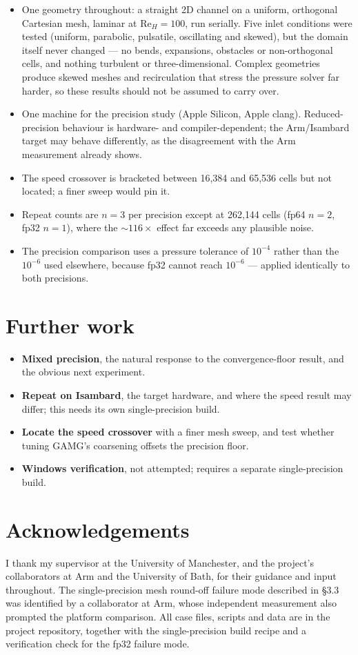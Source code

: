\documentclass[10pt,twocolumn]{article}
\begin{document}
\begin{itemize}
  \item One geometry throughout: a straight 2D channel on a uniform, orthogonal
  Cartesian mesh, laminar at $\mathrm{Re}_H = 100$, run serially. Five inlet
  conditions were tested (uniform, parabolic, pulsatile, oscillating and skewed),
  but the domain itself never changed --- no bends, expansions, obstacles or
  non-orthogonal cells, and nothing turbulent or three-dimensional. Complex
  geometries produce skewed meshes and recirculation that stress the pressure
  solver far harder, so these results should not be assumed to carry over.
  \item One machine for the precision study (Apple Silicon, Apple clang).
  Reduced-precision behaviour is hardware- and compiler-dependent; the
  Arm/Isambard target may behave differently, as the disagreement with the Arm
  measurement already shows.
  \item The speed crossover is bracketed between 16{,}384 and 65{,}536 cells but
  not located; a finer sweep would pin it.
  \item Repeat counts are $n=3$ per precision except at 262{,}144 cells
  (fp64 $n=2$, fp32 $n=1$), where the ${\sim}116\times$ effect far exceeds any
  plausible noise.
  \item The precision comparison uses a pressure tolerance of $10^{-4}$ rather
  than the $10^{-6}$ used elsewhere, because fp32 cannot reach $10^{-6}$ ---
  applied identically to both precisions.
\end{itemize}

\section{Further work}

\begin{itemize}
  \item \textbf{Mixed precision}, the natural response to the
  convergence-floor result, and the obvious next experiment.
  \item \textbf{Repeat on Isambard}, the target hardware, and where the
  speed result may differ; this needs its own single-precision build.
  \item \textbf{Locate the speed crossover} with a finer mesh sweep, and test
  whether tuning GAMG's coarsening offsets the precision floor.
  \item \textbf{Windows verification}, not attempted; requires a separate
  single-precision build.
\end{itemize}

\section*{Acknowledgements}
\small
I thank my supervisor at the University of Manchester, and the project's
collaborators at Arm and the University of Bath, for their guidance and input
throughout. The single-precision mesh round-off failure mode described in
\S3.3 was identified by a collaborator at Arm, whose independent measurement also
prompted the platform comparison. All case files, scripts and data are in the
project repository, together with the single-precision build recipe and a
verification check for the fp32 failure mode.
\end{document}
